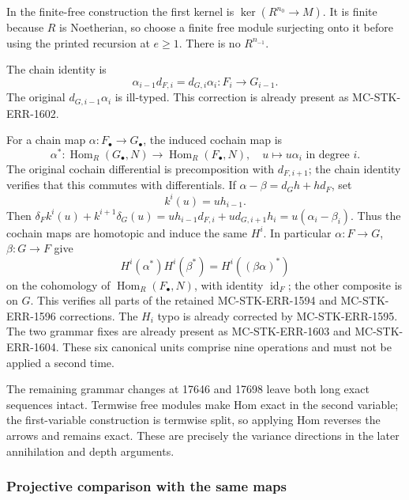 In the finite-free construction the first kernel is \(\ker(R^{n_0}\to M)\). It is finite because \(R\) is Noetherian, so choose a finite free module surjecting onto it before using the printed recursion at \(e\geq1\). There is no \(R^{n_{-1}}\).

The chain identity is \[
\alpha_{i-1}d_{F,i}=d_{G,i}\alpha_i:F_i\longrightarrow G_{i-1}.
\] The original \(d_{G,i-1}\alpha_i\) is ill-typed. This correction is already present as MC-\AlgebraIdentifierBreak{}STK-\AlgebraIdentifierBreak{}ERR-\AlgebraIdentifierBreak{}1602.

For a chain map \(\alpha:F_\bullet\to G_\bullet\), the induced cochain map is \[
\alpha^*:\operatorname{Hom}_R(G_\bullet,N)
\longrightarrow\operatorname{Hom}_R(F_\bullet,N),\quad
u\longmapsto u\alpha_i\text{ in degree }i.
\] The original cochain differential is precomposition with \(d_{F,i+1}\); the chain identity verifies that this commutes with differentials. If \(\alpha-\beta=d_Gh+hd_F\), set \[
k^i(u)=u h_{i-1}.
\] Then \(\delta_F k^i(u)+k^{i+1}\delta_G(u)
=u h_{i-1}d_{F,i}+u d_{G,i+1}h_i=u(\alpha_i-\beta_i)\). Thus the cochain maps are homotopic and induce the same \(H^i\). In particular \(\alpha:F\to G\), \(\beta:G\to F\) give \[
H^i(\alpha^*)H^i(\beta^*)=H^i((\beta\alpha)^*)
\] on the cohomology of \(\operatorname{Hom}_R(F_\bullet,N)\), with identity \(\operatorname{id}_F\); the other composite is on \(G\). This verifies all parts of the retained MC-\AlgebraIdentifierBreak{}STK-\AlgebraIdentifierBreak{}ERR-\AlgebraIdentifierBreak{}1594 and MC-\AlgebraIdentifierBreak{}STK-\AlgebraIdentifierBreak{}ERR-\AlgebraIdentifierBreak{}1596 corrections. The \(H_i\) typo is already corrected by MC-\AlgebraIdentifierBreak{}STK-\AlgebraIdentifierBreak{}ERR-\AlgebraIdentifierBreak{}1595. The two grammar fixes are already present as MC-\AlgebraIdentifierBreak{}STK-\AlgebraIdentifierBreak{}ERR-\AlgebraIdentifierBreak{}1603 and MC-\AlgebraIdentifierBreak{}STK-\AlgebraIdentifierBreak{}ERR-\AlgebraIdentifierBreak{}1604. These six canonical units comprise nine operations and must not be applied a second time.

The remaining grammar changes at 17646 and 17698 leave both long exact sequences intact. Termwise free modules make Hom exact in the second variable; the first-variable construction is termwise split, so applying Hom reverses the arrows and remains exact. These are precisely the variance directions in the later annihilation and depth arguments.

\subsubsection{Projective comparison with the same maps}\label{algebra-proof-007-projective-comparison-with-the-same-maps}

